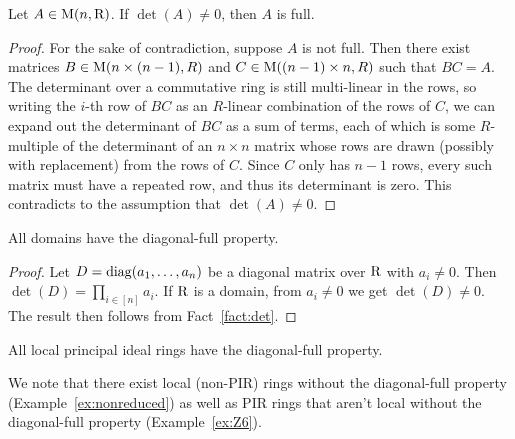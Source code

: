 \begin{fact}\label{fact:det}
	Let $A\in \mathrm{M}(n, \mathrm{R})$. If $\det(A)\neq 0$, then $A$ is full.
\end{fact}
\begin{proof}
	For the sake of contradiction, suppose $A$ is not full. Then there exist matrices $B \in \mathrm{M}(n \times (n-1), R)$ and $C \in \mathrm{M}((n-1) \times n,R)$ such that $BC = A$. The determinant over a commutative ring is still multi-linear in the rows, so writing the $i$-th row of $BC$ as an $R$-linear combination of the rows of $C$, we can expand out the determinant of $BC$ as a sum of terms, each of which is some $R$-multiple of the determinant of an $n \times n$ matrix whose rows are drawn (possibly with replacement) from the rows of $C$. Since $C$ only has $n-1$ rows, every such matrix must have a repeated row, and thus its determinant is zero. This contradicts to the assumption that $\det(A)\neq 0$. 
\end{proof}



\begin{corollary}
All domains have the diagonal-full property.
\end{corollary}
\begin{proof}
Let $D=\operatorname{diag}(a_1, \dots, a_n)$ be a diagonal matrix over $\mathrm{R}$ with $a_i\neq 0$. Then $\det(D)=\prod_{i\in[n]}a_i$. If $\mathrm{R}$ is a domain, from $a_i\neq 0$ we get $\det(D)\neq 0$. The result then follows from Fact~\ref{fact:det}. 
\end{proof}

\begin{proposition}
	All local principal ideal rings have the diagonal-full property.
\end{proposition}

We note that there exist local (non-PIR) rings without the diagonal-full property (Example~\ref{ex:nonreduced}) as well as PIR rings that aren't local without the diagonal-full property (Example~\ref{ex:Z6}).

